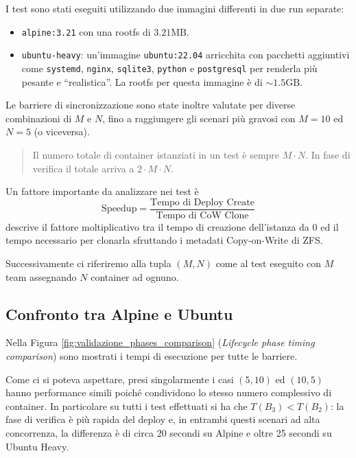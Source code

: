 I test sono stati eseguiti utilizzando due immagini differenti in due
run separate:

\begin{itemize}
\tightlist
\item
  \passthrough{\lstinline!alpine:3.21!} con una rootfs di
  \(\text{3.21MB}\).
\item
  \passthrough{\lstinline!ubuntu-heavy!}: un'immagine
  \passthrough{\lstinline!ubuntu:22.04!} arricchita con pacchetti
  aggiuntivi come \passthrough{\lstinline!systemd!},
  \passthrough{\lstinline!nginx!}, \passthrough{\lstinline!sqlite3!},
  \passthrough{\lstinline!python!} e
  \passthrough{\lstinline!postgresql!} per renderla più pesante e
  ``realistica''. La rootfs per questa immagine è di
  \(\sim \text{1.5GB}\).
\end{itemize}

Le barriere di sincronizzazione sono state inoltre valutate per diverse
combinazioni di \(M\) e \(N\), fino a raggiungere gli scenari più
gravosi con \(M=10\) ed \(N=5\) (o viceversa).

\begin{quote}
Il numero totale di container istanziati in un test è sempre
\(M \cdot N\). In fase di verifica il totale arriva a
\(2 \cdot M \cdot N\).
\end{quote}

Un fattore importante da analizzare nei test è
\[\text{Speedup} = \frac{\text{Tempo di Deploy Create}}{\text{Tempo di CoW Clone}}\]descrive
il fattore moltiplicativo tra il tempo di creazione dell'istanza da 0 ed
il tempo necessario per clonarla sfruttando i metadati Copy-on-Write di
ZFS.

Successivamente ci riferiremo alla tupla \((M,N)\) come al test eseguito
con \(M\) team assegnando \(N\) container ad ognuno.

\subsection{Confronto tra Alpine e
Ubuntu}\label{confronto-tra-alpine-e-ubuntu}

Nella Figura \ref{fig:validazione_phases_comparison} (\emph{Lifecycle
phase timing comparison}) sono mostrati i tempi di esecuzione per tutte
le barriere.

Come ci si poteva aspettare, presi singolarmente i casi \((5,10)\) ed
\((10,5)\) hanno performance simili poiché condividono lo stesso numero
complessivo di container. In particolare su tutti i test effettuati si
ha che \(T(B_{3}) < T(B_{2})\): la fase di verifica è più rapida del
deploy e, in entrambi questi scenari ad alta concorrenza, la differenza
è di circa 20 secondi su Alpine e oltre 25 secondi su Ubuntu Heavy.

